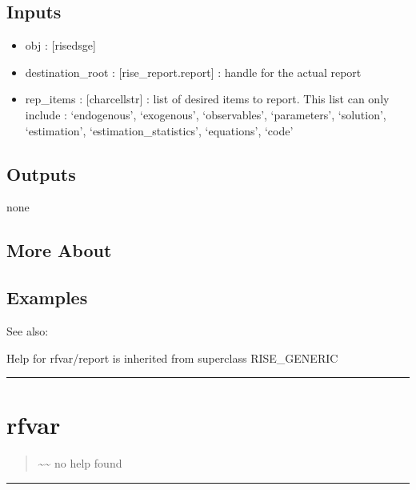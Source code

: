 \documentclass[letterpaper,10pt,english]{sphinxmanual}
\begin{document}
\subsection{Inputs}
\label{classes/models/@rfvar/rfvar:id124}\begin{itemize}
\item {} 
obj : {[}rise\textbar{}dsge{]}

\item {} 
destination\_root : {[}rise\_report.report{]} : handle for the actual report

\item {} 
rep\_items : {[}char\textbar{}cellstr{]} : list of desired items to report. This list
can only include : `endogenous', `exogenous', `observables',
`parameters', `solution', `estimation', `estimation\_statistics',
`equations', `code'

\end{itemize}


\subsection{Outputs}
\label{classes/models/@rfvar/rfvar:id125}
none


\subsection{More About}
\label{classes/models/@rfvar/rfvar:id126}

\subsection{Examples}
\label{classes/models/@rfvar/rfvar:id127}
See also:

Help for rfvar/report is inherited from superclass RISE\_GENERIC


\bigskip\hrule{}\bigskip



\section{rfvar}
\label{classes/models/@rfvar/rfvar:rfvar}\label{classes/models/@rfvar/rfvar:id128}\begin{quote}

\textasciitilde{}\textasciitilde{} no help found
\end{quote}


\bigskip\hrule{}\bigskip
\end{document}
